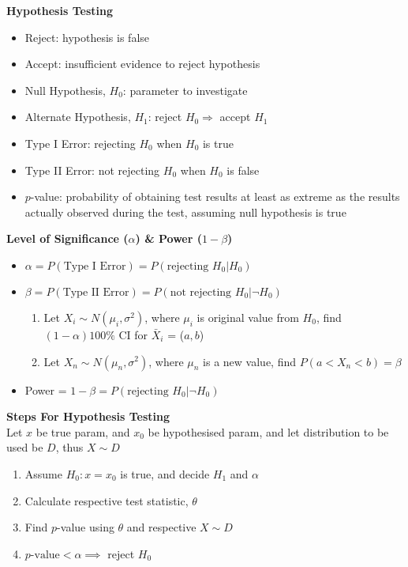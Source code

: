 \documentclass[a4paper, 12pt]{article}
\begin{document}
\begin{multicols*}{4}
\medskip

{\small\textbf{Hypothesis Testing}}
\begin{itemize}
    \item Reject: hypothesis is false
    \item Accept: insufficient evidence to reject hypothesis
    \item Null Hypothesis, $H_0$: parameter to investigate
    \item Alternate Hypothesis, $H_1$: reject $H_0 \Rightarrow$ accept $H_1$
    \item Type I Error: rejecting $H_0$ when $H_0$ is true
    \item Type II Error: not rejecting $H_0$ when $H_0$ is false
    \item $p$-value: probability of obtaining test results at least as extreme as the results actually observed during the test, assuming null hypothesis is true
\end{itemize}
\textbf{Level of Significance ($\alpha$) \& Power ($1-\beta$)}
\begin{itemize}
    \item $\alpha = P(\text{Type I Error}) = P(\text{rejecting }H_0|H_0)$
    \item $\beta = P(\text{Type II Error}) = P(\text{not rejecting } H_0|\neg H_0)$
    \begin{enumerate}
        \item Let $X_i \sim N(\mu_i,\sigma^2)$, where $\mu_i$ is original value from $H_0$, find $(1-\alpha)100\%$ CI for $\bar{X}_i$ = ($a, b$)
        \item Let $X_n \sim N(\mu_n,\sigma^2)$, where $\mu_n$ is a new value, find $P(a<X_n<b) = \beta$
    \end{enumerate}
    \item Power = $1-\beta = P(\text{rejecting }H_0|\neg H_0)$
\end{itemize}
\textbf{Steps For Hypothesis Testing} \\
Let $x$ be true param, and $x_0$ be hypothesised param, and let distribution to be used be $D$, thus $X \sim D$
\begin{enumerate}
    \item Assume $H_0:x=x_0$ is true, and decide $H_1$ and $\alpha$
    \item Calculate respective test statistic, $\theta$
    \item Find $p$-value using $\theta$ and respective $X \sim D$
    \item $p\text{-value}<\alpha \implies$ reject $H_0$

\end{enumerate}
\end{multicols*}
\end{document}
